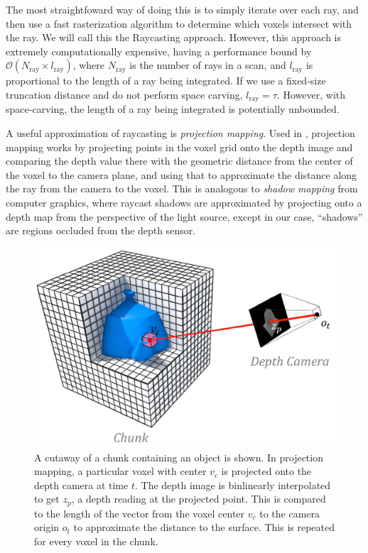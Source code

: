 \documentclass[10pt,twocolumn,letterpaper]{article}
\begin{document}
The most straightfoward way of doing this is to simply iterate over each ray,
and then use a fast rasterization algorithm \cite{RayTracing} to determine which
voxels intersect with the ray. We will call this the Raycasting approach.
However, this approach is extremely computationally expensive, having a
performance bound by $\mathcal{O}(N_{\text{ray}} \times l_{\text{ray}})$, where
$N_{\text{ray}}$ is the number of rays in a scan, and $l_{\text{ray}}$  is 
proportional to the length of a ray being integrated. If we use a fixed-size
truncation distance and do not perform space carving, $l_{\text{ray}} = \tau$.
However, with space-carving, the length of a ray being integrated is
potentially unbounded.

A useful approximation of raycasting is \textit{projection mapping}. Used in
\cite{Nguyen2012, Bylow2013, Klingensmith2014}, projection mapping works by
projecting points in the voxel grid onto the depth image and comparing the depth value
there with the geometric distance from the center of the voxel to the camera
plane, and using that to approximate the distance along the ray from the camera
to the voxel. This is analogous to \textit{shadow mapping} \cite{Shadowmapping}
from computer graphics, where raycast shadows are approximated by projecting
onto a depth map from the perspective of the light source, except in our case, 
``shadows'' are regions occluded from the depth sensor.  

\begin{figure}
  \centering
    \includegraphics[width=0.95\columnwidth]{img/projection_mapping}
      \caption{A cutaway of a chunk containing an object is shown. In projection
      mapping,  a particular voxel with center $v_c$ is projected onto the depth
      camera at time $t$. The depth image is binlinearly interpolated to get
      $z_p$, a depth reading at the projected point. This is compared to the length of the vector
      from the voxel center $v_c$ to the camera origin $o_t$ to approximate the
      distance to the surface. This is repeated for every voxel in the chunk.}
  \label{fig:projection_mapping} 
\end{figure} 
\end{document}
